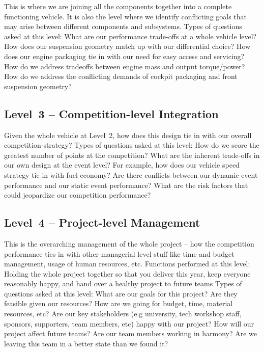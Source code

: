 \documentclass[10pt, a4paper, article, oneside, twocolumn, final]{memoir}
\begin{document}
This is where we are joining all the components together into a complete functioning vehicle. It is also the level where we identify conflicting goals that may arise between different components and subsystems. Types of questions asked at this level: What are our performance trade-offs at a whole vehicle level? How does our suspension geometry match up with our differential choice? How does our engine packaging tie in with our need for easy access and servicing? How do we address tradeoffs between engine mass and output torque/\allowbreak power? How do we address the conflicting demands of cockpit packaging and front suspension geometry? 

\subsection*{Level~3 -- Competition-level Integration}

Given the whole vehicle at Level~2, how does this design tie in with our overall competition-strategy? Types of questions asked at this level: How do we score the greatest number of points at the competition? What are the inherent trade-offs in our own design at the event level? For example, how does our vehicle speed strategy tie in with fuel economy? Are there conflicts between our dynamic event performance and our static event performance? What are the risk factors that could jeopardize our competition performance? 

\subsection*{Level~4 -- Project-level Management}

This is the overarching management of the whole project -- how the competition performance ties in with other managerial level stuff like time and budget management, usage of human resources, etc. Functions performed at this level: Holding the whole project together so that you deliver this year, keep everyone reasonably happy, and hand over a healthy project to future teams Types of questions asked at this level: What are our goals for this project? Are they feasible given our resources? How are we going for budget, time, material resources, etc? Are our key stakeholders (e.g university, tech workshop staff, sponsors, supporters, team members, etc) happy with our project? How will our project affect future teams? Are our team members working in harmony? Are we leaving this team in a better state than we found it? 
\end{document}
